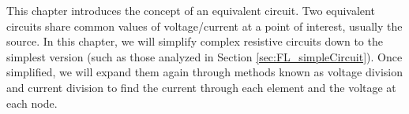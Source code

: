 This chapter introduces the concept of an equivalent circuit.  Two equivalent circuits share common values of voltage/current at a point of interest, usually the source.  In this chapter, we will simplify complex resistive circuits down to the simplest version (such as those analyzed in Section \ref{sec:FL_simpleCircuit}).  Once simplified, we will expand them again through methods known as voltage division and current division to find the current through each element and the voltage at each node.

